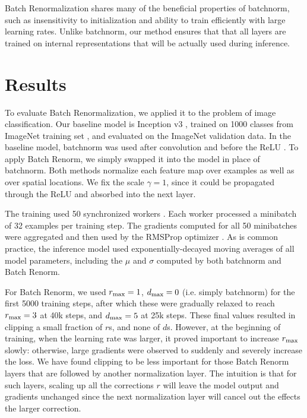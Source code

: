 Batch Renormalization shares many of the beneficial properties of batchnorm, such as insensitivity to initialization and ability to train efficiently with large learning rates. Unlike batchnorm, our method ensures that that all layers are trained on internal representations that will be actually used during inference.


\section{Results}

To evaluate Batch Renormalization, we applied it to the problem of image classification. Our baseline model is Inception v3 \cite{inception-v3}, trained on 1000 classes from ImageNet training set \cite{imagenet}, and evaluated on the ImageNet validation data. In the baseline model, batchnorm was used after convolution and before the ReLU \cite{relu}. 
To apply Batch Renorm, we simply swapped it into the model in place of batchnorm. Both methods normalize each feature map over examples as well as over spatial locations. We fix the scale $\gamma=1$, since it could be propagated through the ReLU and absorbed into the next layer. 

The training used 50 synchronized workers \cite{syncreplicas}. Each worker processed a minibatch of 32 examples per training step. The gradients computed for all 50 minibatches were aggregated and then used by the RMSProp optimizer \cite{rmsprop}. As is common practice, the inference model used exponentially-decayed moving averages of all model parameters, including the $\mu$ and $\sigma$ computed by both batchnorm and Batch Renorm.

For Batch Renorm, we used $r_{\text{max}}=1$, $d_{\text{max}}=0$ (i.e. simply batchnorm) for the first 5000 training steps, after which these were gradually relaxed to reach $r_{\text{max}}=3$ at 40k steps, and $d_{\text{max}}=5$ at 25k steps. These final values resulted in clipping a small fraction of $r$s, and none of $d$s. However, at the beginning of training, when the learning rate was larger, it proved important to increase $r_{\text{max}}$ slowly: otherwise, large gradients were observed to suddenly and severely increase the loss. We have found clipping to be less important for those Batch Renorm layers that are followed by another normalization layer. The intuition is that for such layers, scaling up all the corrections $r$ will leave the model output and gradients unchanged since the next normalization layer will cancel out the effects the larger correction. 

